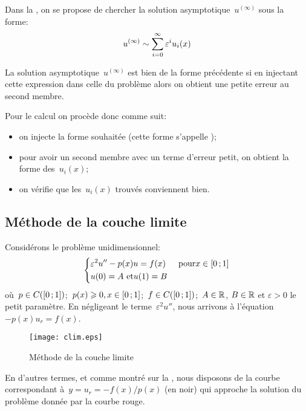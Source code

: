 Dans la , on se propose de chercher la
solution asymptotique~$u^{(\infty)}$ sous la forme:
\begin{equation}
u^{(\infty)} \sim \displaystyle\sum_{i=0}^\infty \varepsilon^iu_i(x)
\end{equation}

\medskip
La solution asymptotique~$u^{(\infty)}$ est bien de la forme précédente si en injectant
cette expression dans celle du problème alors on obtient une petite erreur au second membre.

\medskip
Pour le calcul on procède donc comme suit:
\begin{itemize}
  \item on injecte la forme souhaitée (cette forme s'appelle );
  \item pour avoir un second membre avec un terme d'erreur petit, on obtient la forme des~$u_i(x)$;
  \item on vérifie que les~$u_i(x)$ trouvés conviennent bien.
\end{itemize}


\medskip
\subsection{Méthode de la couche limite}
Considérons le problème unidimensionnel:
\begin{equation}
\left\{
\begin{aligned}
&\varepsilon^2u''-p(x)u= f(x) &&\text{ pour} x\in\mathopen{[}0\,;1\mathclose{]}\\
&u(0)=A \text{ et} u(1)=B
\end{aligned}
\right.
\end{equation}
où~$p\in C(\mathopen{[}0\,;1\mathclose{]})$;~$p(x)\geqslant0, x\in\mathopen{[}0\,;1\mathclose{]}$;~$f\in C(\mathopen{[}0\,;1\mathclose{]})$;~$A\in\mathbb R$, $B\in\mathbb R$ et
$\varepsilon>0$ le petit paramètre.
En négligeant le terme~$\varepsilon^2 u''$, nous arrivons à l'équation~$-p(x)u_r=f(x)$.
\begin{figure}[ht]
\centering\texttt{[image: clim.eps]}
\caption{Méthode de la couche limite}\label{Fig-clim}
\end{figure}
En d'autres termes, et comme montré sur la , nous disposons de la
courbe correspondant à~$y=u_r=-f(x)/p(x)$ (en noir) qui approche la solution du problème donnée par la courbe rouge.

